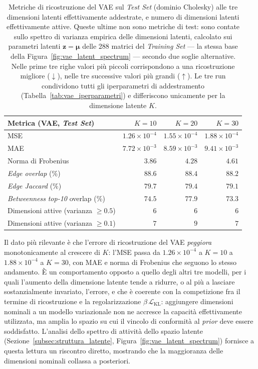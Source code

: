 \begin{table}[htbp]
\centering
\small
\begin{tabular}{lrrr}
\hline
\textbf{Metrica (VAE, \emph{Test Set})} & $K=10$ & $K=20$ & $K=30$ \\
\hline
MSE & $1.26\times10^{-4}$ & $1.55\times10^{-4}$ & $1.88\times10^{-4}$ \\
MAE & $7.72\times10^{-3}$ & $8.59\times10^{-3}$ & $9.41\times10^{-3}$ \\
Norma di Frobenius & $3.86$ & $4.28$ & $4.61$ \\
\hline
\emph{Edge overlap} (\%) & $88.6$ & $88.4$ & $88.2$ \\
\emph{Edge Jaccard} (\%) & $79.7$ & $79.4$ & $79.1$ \\
\emph{Betweenness} \emph{top-10} overlap (\%) & $74.5$ & $77.9$ & $73.3$ \\
\hline
Dimensioni attive (varianza $\geq 0.5$) & $6$ & $6$ & $6$ \\
Dimensioni attive (varianza $\geq 0.1$) & $7$ & $9$ & $7$ \\
\hline
\end{tabular}
\caption{Metriche di ricostruzione del VAE sul \emph{Test Set} (dominio Cholesky) alle tre dimensioni latenti effettivamente addestrate, e numero di dimensioni latenti effettivamente attive. Queste ultime non sono metriche di test: sono contate sullo spettro di varianza empirica delle dimensioni latenti, calcolato sui parametri latenti $\mathbf{z}=\boldsymbol{\mu}$ delle $288$ matrici del \emph{Training Set} --- la stessa base della Figura~\ref{fig:vae_latent_spectrum} --- secondo due soglie alternative. Nelle prime tre righe valori più piccoli corrispondono a una ricostruzione migliore ($\downarrow$), nelle tre successive valori più grandi ($\uparrow$). Le tre run condividono tutti gli iperparametri di addestramento (Tabella~\ref{tab:vae_iperparametri}) e differiscono unicamente per la dimensione latente $K$.}
\label{tab:vae_vs_k_test}
\end{table}

Il dato più rilevante è che l'errore di ricostruzione del VAE \emph{peggiora} monotonicamente al crescere di $K$: l'MSE passa da $1.26\times10^{-4}$ a $K=10$ a $1.88\times10^{-4}$ a $K=30$, con MAE e norma di Frobenius che seguono lo stesso andamento. È un comportamento opposto a quello degli altri tre modelli, per i quali l'aumento della dimensione latente tende a ridurre, o al più a lasciare sostanzialmente invariato, l'errore, e che è coerente con la competizione fra il termine di ricostruzione e la regolarizzazione $\beta\,\mathcal{L}_{\text{KL}}$: aggiungere dimensioni nominali a un modello variazionale non ne accresce la capacità effettivamente utilizzata, ma amplia lo spazio su cui il vincolo di conformità al \emph{prior} deve essere soddisfatto. L'analisi dello spettro di attività dello spazio latente (Sezione~\ref{subsec:struttura_latente}, Figura~\ref{fig:vae_latent_spectrum}) fornisce a questa lettura un riscontro diretto, mostrando che la maggioranza delle dimensioni nominali collassa a posteriori.

